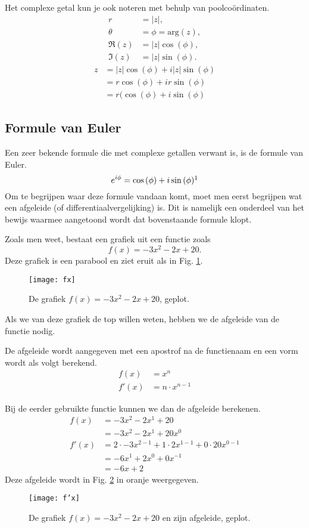 \documentclass[11pt,fleqn]{book} %
\begin{document}
Het complexe getal kun je ook noteren met behulp van poolcoördinaten.
\begin{align*}
r &=\left|z\right|,\\
\theta &=\phi=\text{arg}(z),\\
\Re(z) &=\left|z\right|\cos{(\phi)},\\
\Im(z) &=\left|z\right|\sin{(\phi)}.
\end{align*}
\begin{align*}
z &=\left|z\right|\cos{(\phi)}+i\left|z\right|\sin{(\phi)}\\
&= r\cos{(\phi)}+ir\sin{(\phi)}\\
&= r(\cos{(\phi)}+i\sin{(\phi)}
\end{align*}

\subsection{Formule van Euler}
Een zeer bekende formule die met complexe getallen verwant is, is de formule van Euler.
\begin{equation}\label{eq:euler}
e^{i\phi}=\cos{(\phi)}+i\sin{(\phi)}\footnotemark
\end{equation}
Om te begrijpen waar deze formule vandaan komt, moet men eerst begrijpen wat een afgeleide (of differentiaalvergelijking) is. Dit is namelijk een onderdeel van het bewijs waarmee aangetoond wordt dat bovenstaande formule klopt.

Zoals men weet, bestaat een grafiek uit een functie zoals
\begin{displaymath}
f(x)=-3x^2-2x+20.
\end{displaymath}
Deze grafiek is een parabool en ziet eruit als in Fig. \ref{fig:fx3}.
\begin{figure}[h]
	\centering\texttt{[image: fx]}
	\caption{De grafiek $f(x)=-3x^2-2x+20$, geplot.}
	\label{fig:fx3}
\end{figure}
Als we van deze grafiek de top willen weten, hebben we de afgeleide van de functie nodig.
\begin{definition}
De afgeleide wordt aangegeven met een apostrof na de functienaam en een vorm wordt als volgt berekend.
\begin{align*}
f(x) &=x^n\\
f'(x) &=n\cdot x^{n-1}
\end{align*}
\end{definition}
Bij de eerder gebruikte functie kunnen we dan de afgeleide berekenen.
\begin{align*}
f(x) &=-3x^2-2x^1+20\\
&=-3x^2-2x^1+20x^0\\
f'(x) &= 2\cdot -3x^{2-1}+1\cdot 2x^{1-1}+0\cdot 20x^{0-1}\\
&=-6x^1+2x^0 +0x^{-1}\\
&=-6x+2
\end{align*}
Deze afgeleide wordt in Fig. \ref{fig:f'x} in oranje weergegeven.
\begin{figure}[h]
	\centering\texttt{[image: f'x]}
	\caption{De grafiek $f(x)=-3x^2-2x+20$ en zijn afgeleide, geplot.}
	\label{fig:f'x}
\end{figure}
\end{document}
